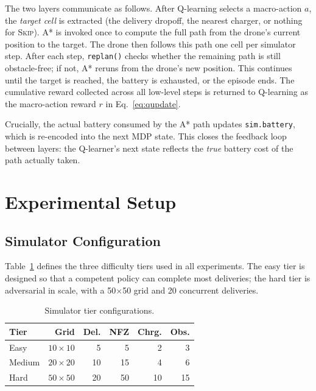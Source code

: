 \documentclass[11pt,twocolumn]{article}
\begin{document}
The two layers communicate as follows.
After Q-learning selects a macro-action $a$, the \emph{target cell} is
extracted (the delivery dropoff, the nearest charger, or nothing for
\textsc{Skip}).
A* is invoked once to compute the full path from the drone's current
position to the target.
The drone then follows this path one cell per simulator step.
After each step, \texttt{replan()} checks whether the remaining path is
still obstacle-free; if not, A* reruns from the drone's new position.
This continues until the target is reached, the battery is exhausted, or
the episode ends.
The cumulative reward collected across all low-level steps is returned
to Q-learning as the macro-action reward $r$ in Eq.~\eqref{eq:qupdate}.

Crucially, the actual battery consumed by the A* path updates
\texttt{sim.battery}, which is re-encoded into the next MDP state.
This closes the feedback loop between layers: the Q-learner's next
state reflects the \emph{true} battery cost of the path actually taken.

\section{Experimental Setup}
\label{sec:experiments}

\subsection{Simulator Configuration}

Table~\ref{tab:tiers} defines the three difficulty tiers used in
all experiments.
The easy tier is designed so that a competent policy can complete most
deliveries; the hard tier is adversarial in scale, with a 50$\times$50
grid and 20 concurrent deliveries.

\begin{table}[H]
\centering
\small
\caption{Simulator tier configurations.}
\label{tab:tiers}
\begin{tabular}{lrrrrr}
\toprule
\textbf{Tier} & \textbf{Grid} & \textbf{Del.} & \textbf{NFZ} &
\textbf{Chrg.} & \textbf{Obs.} \\
\midrule
Easy   & $10{\times}10$ & 5  & 5  & 2  & 3  \\
Medium & $20{\times}20$ & 10 & 15 & 4  & 6  \\
Hard   & $50{\times}50$ & 20 & 50 & 10 & 15 \\
\bottomrule
\end{tabular}
\end{table}
\end{document}

